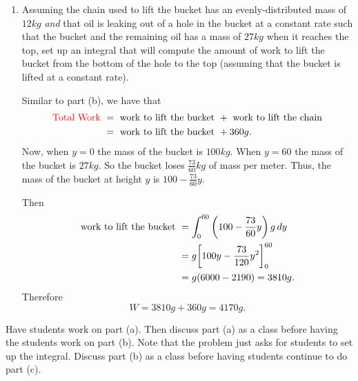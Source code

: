 \documentclass[noinstructornotes]{ximera}
\begin{document}
\begin{problem}
\begin{enumerate}
		
		
		\item  Assuming the chain used to lift the bucket has an evenly-distributed mass of $12kg$ {\it and} that oil is leaking out of a hole in the bucket at a constant rate such that the bucket and the remaining oil has a mass of $27kg$ when it reaches the top, set up an integral that will compute the amount of work to lift the bucket from the bottom of the hole to the top (assuming that the bucket is lifted at a constant rate).
		\begin{freeResponse}
		Similar to part (b), we have that
			\begin{align*}
			\text{{\color{red}Total Work} } &= \text{ work to lift the bucket } + \text{ work to lift the chain}  \\
			&= \text{ work to lift the bucket } + 360g.
			\end{align*}
		Now, when $y=0$ the mass of the bucket is $100 kg$.  
		When $y=60$ the mass of the bucket is $27kg$.  
		So the bucket loses $\frac{73}{60} kg$ of mass per meter.  
		Thus, the mass of the bucket at height $y$ is $100 - \frac{73}{60} y$.  
		
		Then
			\begin{align*}
			\text{work to lift the bucket } &= \int_0^{60} \left(100 - \frac{73}{60} y \right) g \,d y  \\
			&= g \bigg[ 100y - \frac{73}{120} y^2  \bigg]_0^{60}  \\
			&= g (6000 - 2190) = 3810 g.
			\end{align*}
		Therefore
			\[
			W = 3810g + 360g = 4170g.
			\]
		\end{freeResponse}
		
	\end{enumerate}

\end{problem}

\begin{instructorNotes}
Have students work on part (a). Then discuss part (a) as a class before having the students work on part (b). Note that the problem just asks for students to set up the integral. Discuss part (b) as a class before having students continue to do part (c).
\end{instructorNotes}


















	
	
	
	
	
	
	
	
	

	










								
				
				
	
\end{document}

